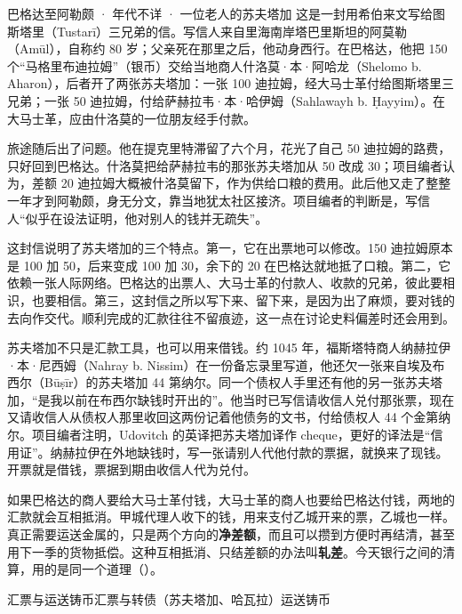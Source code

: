 \begin{case}{巴格达至阿勒颇 · 年代不详 · 一位老人的苏夫塔加}
这是一封用希伯来文写给图斯塔里（Tustarī）三兄弟的信。写信人来自里海南岸塔巴里斯坦的阿莫勒（Amūl），自称约 80 岁；父亲死在那里之后，他动身西行。在巴格达，他把 150 个“马格里布迪拉姆”（银币）交给当地商人什洛莫·本·阿哈龙（Shelomo b. Aharon），后者开了两张苏夫塔加：一张 100 迪拉姆，经大马士革付给图斯塔里三兄弟；一张 50 迪拉姆，付给萨赫拉韦·本·哈伊姆（Sahlawayh b. Ḥayyim）\cite{pgp39110}。在大马士革，应由什洛莫的一位朋友经手付款。

旅途随后出了问题。他在提克里特滞留了六个月，花光了自己 50 迪拉姆的路费，只好回到巴格达。什洛莫把给萨赫拉韦的那张苏夫塔加从 50 改成 30；项目编者认为，差额 20 迪拉姆大概被什洛莫留下，作为供给口粮的费用。此后他又走了整整一年才到阿勒颇，身无分文，靠当地犹太社区接济。项目编者的判断是，写信人“似乎在设法证明，他对别人的钱并无疏失”\cite{pgp39110}。

这封信说明了苏夫塔加的三个特点。第一，它在出票地可以修改。150 迪拉姆原本是 100 加 50，后来变成 100 加 30，余下的 20 在巴格达就地抵了口粮。第二，它依赖一张人际网络。巴格达的出票人、大马士革的付款人、收款的兄弟，彼此要相识，也要相信。第三，这封信之所以写下来、留下来，是因为出了麻烦，要对钱的去向作交代。顺利完成的汇款往往不留痕迹，这一点在讨论史料偏差时还会用到。
\end{case}

苏夫塔加不只是汇款工具，也可以用来借钱。约 1045 年，福斯塔特商人纳赫拉伊·本·尼西姆（Nahray b. Nissim）在一份备忘录里写道，他还欠一张来自埃及布西尔（Būṣīr）的苏夫塔加 44 第纳尔。同一个债权人手里还有他的另一张苏夫塔加，“是我以前在布西尔缺钱时开出的”。他当时已写信请收信人兑付那张票，现在又请收信人从债权人那里收回这两份记着他债务的文书，付给债权人 44 个金第纳尔\cite{pgp6039}。项目编者注明，Udovitch 的英译把苏夫塔加译作 cheque，更好的译法是“信用证”。纳赫拉伊在外地缺钱时，写一张请别人代他付款的票据，就换来了现钱。开票就是借钱，票据到期由收信人代为兑付。

\begin{intuition}[两头的汇款互相抵消]
如果巴格达的商人要给大马士革付钱，大马士革的商人也要给巴格达付钱，两地的汇款就会互相抵消。甲城代理人收下的钱，用来支付乙城开来的票，乙城也一样。真正需要运送金属的，只是两个方向的\textbf{净差额}，而且可以攒到方便时再结清，甚至用下一季的货物抵偿。这种互相抵消、只结差额的办法叫\textbf{轧差}。今天银行之间的清算，用的是同一个道理（）。
\end{intuition}

\begin{compare}{汇票与运送铸币}{汇票与转债（苏夫塔加、哈瓦拉）}{运送铸币}
\end{compare}

